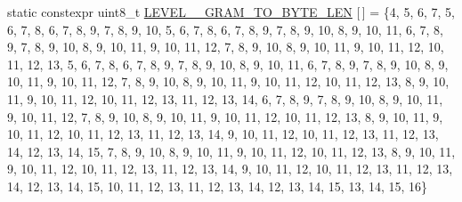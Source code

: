 \begin{DoxyCompactItemize}
static constexpr uint8\+\_\+t \hyperlink{classuva_1_1smt_1_1bpbd_1_1server_1_1lm_1_1m__grams_1_1m__gram__id_1_1_byte___m___gram___id_a54fe1f83a3013ff7d262ec4827a208fb}{L\+E\+V\+E\+L\+\_\+\_\+\+G\+R\+A\+M\+\_\+\+T\+O\+\_\+\+B\+Y\+T\+E\+\_\+\+L\+E\+N} \mbox{[}$\,$\mbox{]} = \{4, 5, 6, 7, 5, 6, 7, 8, 6, 7, 8, 9, 7, 8, 9, 10, 5, 6, 7, 8, 6, 7, 8, 9, 7, 8, 9, 10, 8, 9, 10, 11, 6, 7, 8, 9, 7, 8, 9, 10, 8, 9, 10, 11, 9, 10, 11, 12, 7, 8, 9, 10, 8, 9, 10, 11, 9, 10, 11, 12, 10, 11, 12, 13, 5, 6, 7, 8, 6, 7, 8, 9, 7, 8, 9, 10, 8, 9, 10, 11, 6, 7, 8, 9, 7, 8, 9, 10, 8, 9, 10, 11, 9, 10, 11, 12, 7, 8, 9, 10, 8, 9, 10, 11, 9, 10, 11, 12, 10, 11, 12, 13, 8, 9, 10, 11, 9, 10, 11, 12, 10, 11, 12, 13, 11, 12, 13, 14, 6, 7, 8, 9, 7, 8, 9, 10, 8, 9, 10, 11, 9, 10, 11, 12, 7, 8, 9, 10, 8, 9, 10, 11, 9, 10, 11, 12, 10, 11, 12, 13, 8, 9, 10, 11, 9, 10, 11, 12, 10, 11, 12, 13, 11, 12, 13, 14, 9, 10, 11, 12, 10, 11, 12, 13, 11, 12, 13, 14, 12, 13, 14, 15, 7, 8, 9, 10, 8, 9, 10, 11, 9, 10, 11, 12, 10, 11, 12, 13, 8, 9, 10, 11, 9, 10, 11, 12, 10, 11, 12, 13, 11, 12, 13, 14, 9, 10, 11, 12, 10, 11, 12, 13, 11, 12, 13, 14, 12, 13, 14, 15, 10, 11, 12, 13, 11, 12, 13, 14, 12, 13, 14, 15, 13, 14, 15, 16\}
\item 

\end{DoxyCompactItemize}
